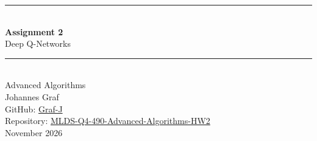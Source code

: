 \documentclass[11pt,a4paper]{article}
\begin{document}
\hypersetup{pageanchor=false}
\begin{titlepage}
  \centering
  \vspace*{3.5cm}
  {\color{accent}\rule{\textwidth}{1.2pt}}\\[1.2em]
  {\Huge\bfseries\color{accent} Assignment 2}\\[0.6em]
  {\LARGE Deep Q-Networks}\\[1.0em]
  {\color{accent}\rule{\textwidth}{1.2pt}}\\[2.5em]
  {\Large Advanced Algorithms}\\[3.5em]
  {\large Johannes Graf}\\[0.3em]
  {\normalsize GitHub: \href{https://github.com/Graf-J}{Graf-J}}\\[0.3em]
  {\normalsize Repository: \href{https://github.com/Graf-J/MLDS-Q4-490-Advanced-Algorithms-HW2}{MLDS-Q4-490-Advanced-Algorithms-HW2}}\\[3em]
  {\normalsize November 2026}
  \vfill
\end{titlepage}
\hypersetup{pageanchor=true}

\tableofcontents
\clearpage





\end{document}
